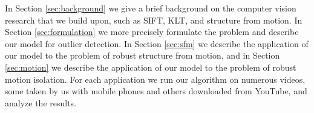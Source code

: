 In Section \ref{sec:background} we give a brief background on the computer
vision research that we build upon, such as SIFT, KLT, and structure from
motion.  In Section \ref{sec:formulation} we more precisely formulate the
problem and describe our model for outlier detection.  In Section \ref{sec:sfm}
we describe the application of our model to the problem of robust structure
from motion, and in Section \ref{sec:motion} we describe the application of our
model to the problem of robust motion isolation.  For each application we run
our algorithm on numerous videos, some taken by us with mobile phones and
others downloaded from YouTube, and analyze the results.
